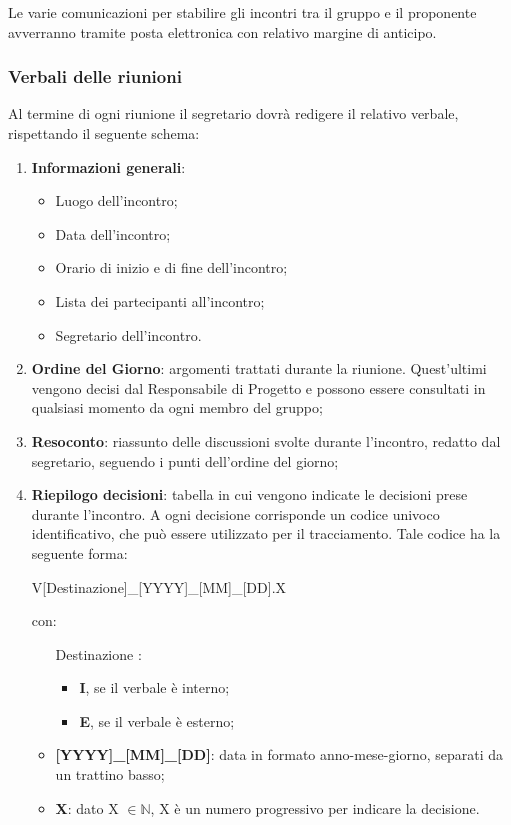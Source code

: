 Le varie comunicazioni per stabilire gli incontri tra il gruppo e il proponente avverranno tramite posta elettronica con relativo margine di anticipo.
\subsubsection{Verbali delle riunioni}
Al termine di ogni riunione il segretario dovrà redigere il relativo verbale, rispettando il seguente
schema:
\begin{enumerate}
	\item \textbf{Informazioni generali}:
		\begin{itemize}
			\item Luogo dell'incontro;
			\item Data dell'incontro;
			\item Orario di inizio e di fine dell'incontro;
			\item Lista dei partecipanti all'incontro;
			\item Segretario dell'incontro.
		\end{itemize}
	\item \textbf{Ordine del Giorno}: argomenti trattati durante la riunione. Quest’ultimi vengono decisi dal Responsabile di Progetto e possono essere consultati in qualsiasi momento da ogni membro del gruppo;
	\item \textbf{Resoconto}: riassunto delle discussioni svolte durante l'incontro, redatto dal segretario, seguendo i punti dell’ordine del giorno;
	\item \textbf{Riepilogo decisioni}: tabella in cui vengono indicate le decisioni prese durante l'incontro.
	A ogni decisione corrisponde un codice univoco identificativo, che può essere utilizzato per il tracciamento.
	Tale codice ha la seguente forma:
	\begin{center}
		V[Destinazione]\_[YYYY]\_[MM]\_[DD].X	
	\end{center}
	con:
	\begin{itemize}
		\item [Destinazione]:
		\begin{itemize}
			\item \textbf{I}, se il verbale è interno;
			\item \textbf{E}, se il verbale è esterno;
		\end{itemize}
		\item \textbf{[YYYY]\_[MM]\_[DD]}: data in formato anno-mese-giorno, separati da un trattino basso;
		\item \textbf{X}: dato X $\in \mathbb{N}$, X è un numero progressivo per indicare la decisione.
	\end{itemize}
\end{enumerate}


